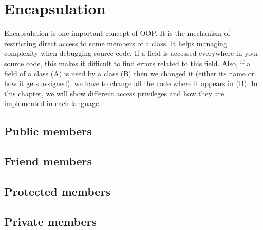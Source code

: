 \documentclass{KodeBook}
\begin{document}
\fi

\chapter{Encapsulation}

\begin{introduction}
	Encapsulation is one important concept of OOP. 
	It is the mechanism of restricting direct access to some members of a class.
	It helps managing complexity when debugging source code. 
	If a field is accessed everywhere in your source code, this makes it difficult to find errors related to this field. 
	Also, if a field of a class (A) is used by a class (B) then we changed it (either its name or how it gets assigned), we have to change all the code where it appears in (B).
	In this chapter, we will show different access privileges and how they are implemented in each language.
\end{introduction}

\section{Public members}


\section{Friend members}


\section{Protected members}


\section{Private members}




\ifx\wholebook\relax\else
% 
% 
	
\end{document}
